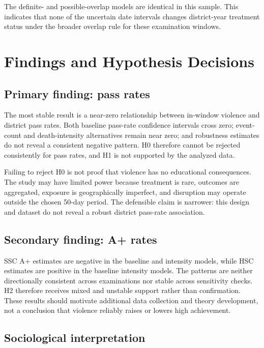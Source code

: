 \documentclass[11pt]{article}
\begin{document}
The definite- and possible-overlap models are identical in this sample. This indicates that none of the uncertain date intervals changes district-year treatment status under the broader overlap rule for these examination windows.

\section{Findings and Hypothesis Decisions}

\subsection{Primary finding: pass rates}

The most stable result is a near-zero relationship between in-window violence and district pass rates. Both baseline pass-rate confidence intervals cross zero; event-count and death-intensity alternatives remain near zero; and robustness estimates do not reveal a consistent negative pattern. H0 therefore cannot be rejected consistently for pass rates, and H1 is not supported by the analyzed data.

Failing to reject H0 is not proof that violence has no educational consequences. The study may have limited power because treatment is rare, outcomes are aggregated, exposure is geographically imperfect, and disruption may operate outside the chosen 50-day period. The defensible claim is narrower: this design and dataset do not reveal a robust district pass-rate association.

\subsection{Secondary finding: A+ rates}

SSC A+ estimates are negative in the baseline and intensity models, while HSC estimates are positive in the baseline intensity models. The patterns are neither directionally consistent across examinations nor stable across sensitivity checks. H2 therefore receives mixed and unstable support rather than confirmation. These results should motivate additional data collection and theory development, not a conclusion that violence reliably raises or lowers high achievement.

\subsection{Sociological interpretation}
\end{document}
